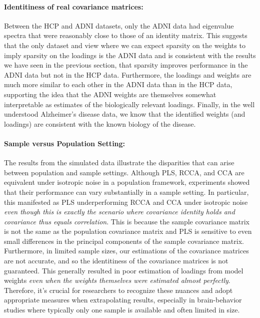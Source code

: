 \paragraph{Identitiness of real covariance matrices:} Between the HCP and ADNI datasets, only the ADNI data had eigenvalue spectra that were reasonably close to those of an identity matrix.
This suggests that the only dataset and view where we can expect sparsity on the weights to imply sparsity on the loadings is the ADNI data and is consistent with the results we have seen in the previous section, that sparsity improves performance in the ADNI data but not in the HCP data.
Furthermore, the loadings and weights are much more similar to each other in the ADNI data than in the HCP data, supporting the idea that the ADNI weights are themselves somewhat interpretable as estimates of the biologically relevant loadings.
Finally, in the well understood Alzheimer's disease data, we know that the identified weights (and loadings) are consistent with the known biology of the disease.

\paragraph{Sample versus Population Setting:} The results from the simulated data illustrate the disparities that can arise between population and sample settings.
Although PLS, RCCA, and CCA are equivalent under isotropic noise in a population framework, experiments showed that their performance can vary substantially in a sample setting.
In particular, this manifested as PLS underperforming RCCA and CCA under isotropic noise \textit{even though this is exactly the scenario where covariance identity holds and covariance thus equals correlation}.
This is because the sample covariance matrix is not the same as the population covariance matrix and PLS is sensitive to even small differences in the principal components of the sample covariance matrix.
Furthermore, in limited sample sizes, our estimations of the covariance matrices are not accurate, and so the identitiness of the covariance matrices is not guaranteed.
This generally resulted in poor estimation of loadings from model weights \textit{even when the weights themselves were estimated almost perfectly}.
Therefore, it's crucial for researchers to recognize these nuances and adopt appropriate measures when extrapolating results, especially in brain-behavior studies where typically only one sample is available and often limited in size.

